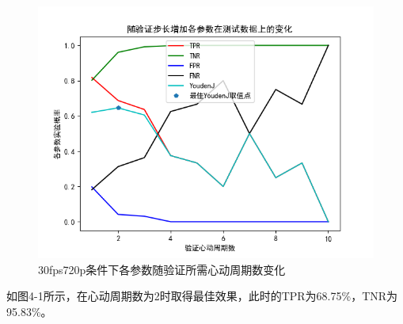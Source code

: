 \begin{itemize}
{\begin{figure}[H]
  \centering
  \includegraphics[width=0.7\linewidth]{images/30fps720p.png}
  \caption{30fps720p条件下各参数随验证所需心动周期数变化}\label{4-1} %
\end{figure}

\par
{如图4-1所示，在心动周期数为2时取得最佳效果，此时的TPR为68.75\%，TNR为95.83\%。}}




\end{itemize}
